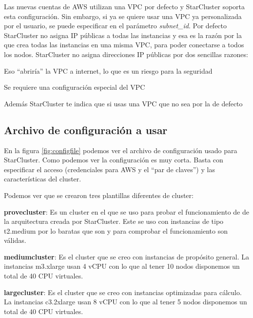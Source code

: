 \documentclass{article}
\begin{document}
	Las nuevas cuentas de AWS utilizan una VPC por defecto y  StarCluster soporta esta configuración. Sin embargo, si ya se quiere usar una VPC ya personalizada por el usuario, se puede especificar en el parámetro \emph{subnet\_id}. Por defecto StarCluster no asigna IP públicas a todas las instancias y esa es la razón por la que crea todas las instancias en una misma VPC, para poder conectarse a todos los nodos. StarCluster no asigna direcciones IP públicas por dos sencillas razones:
{\setlength{\parskip}{0mm}
\begin{enumerate}
{\setlength{\parskip}{0mm}
	\item Eso ``abriría'' la VPC a internet, lo que es un riesgo para la seguridad
	\item Se requiere una configuración especial del VPC
}
\end{enumerate} 
}
	Además StarCluster te indica que si usas una VPC que no sea por la de defecto

\subsection{Archivo de configuración a usar}
	En la figura \ref{fig:configfile} podemos ver el archivo de configuración usado para StarCluster. Como podemos ver la configuración es muy corta. Basta con especificar el acceso (credenciales para AWS y el ``par de claves'') y las características del cluster.
	
	Podemos ver que se crearon tres plantillas diferentes de cluster:
{\setlength{\parskip}{0mm}
\begin{enumerate}
{\setlength{\parskip}{0mm}
	\item \textbf{provecluster}: Es un cluster en el que se uso para probar el funcionamiento de de la arquitectura creada por StarCluster. Este se uso con instancias de tipo t2.medium por lo baratas que son y para comprobar el funcionamiento son válidas.
	\item \textbf{mediumcluster}: Es el cluster que se creo con instancias de propósito general. La instancias m3.xlarge usan 4 vCPU con lo que al tener 10 nodos disponemos un total de 40 CPU virtuales.
	\item \textbf{largecluster}: Es el cluster que se creo con instancias optimizadas para cálculo. La instancias c3.2xlarge usan 8 vCPU con lo que al tener 5 nodos disponemos un total de 40 CPU virtuales.
}
\end{enumerate}
}
\end{document}
